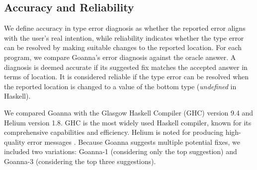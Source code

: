 \documentclass[pdflatex,sn-mathphys-num]{sn-jnl}%
\begin{document}
\subsection{Accuracy and Reliability} \label{sub:eval-accuracy}

We define accuracy in type error diagnosis as whether the reported error aligns with the user's real intention, while reliability indicates whether the type error can be resolved by making suitable changes to the reported location. For each program, we compare Goanna's error diagnosis against the oracle answer. A diagnosis is deemed accurate if its suggested fix matches the accepted answer in terms of location. It is considered reliable if the type error can be resolved when the reported location is changed to a value of the bottom type (\textit{undefined} in Haskell).

We compared Goanna with the Glasgow Haskell Compiler (GHC) version 9.4 \cite{Gamari_undated-zu} and Helium \cite{Hage2023-kk} version 1.8. GHC is the most widely used Haskell compiler, known for its comprehensive capabilities and efficiency. Helium is noted for producing high-quality error messages \cite{Heeren2003-kd}. Because Goanna suggests multiple potential fixes, we included two variations: Goanna-1 (considering only the top suggestion) and Goanna-3 (considering the top three suggestions).
\end{document}
